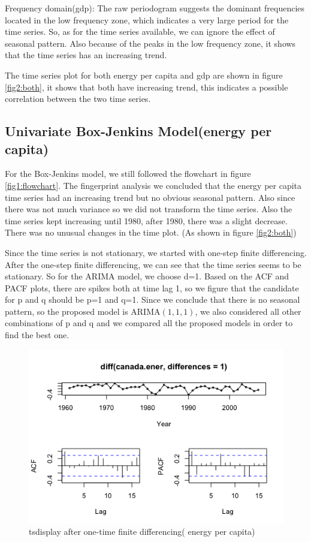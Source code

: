 \documentclass[journal, a4paper]{IEEEtran}
\begin{document}
Frequency domain(gdp): The raw periodogram suggests the dominant frequencies located in the low frequency zone, which indicates a very large period for the time series. So, as for the time series available, we can ignore the effect of seasonal pattern. Also because of the peaks in the low frequency zone, it shows that the time series has an increasing trend.


The time series plot for both energy per capita and gdp are shown in figure \ref{fig2:both}, it shows that both have increasing trend, this indicates a possible correlation between the two time series. 

\subsection{Univariate Box-Jenkins Model(energy per capita)}
For the Box-Jenkins model, we still followed the flowchart in figure \ref{fig1:flowchart}. The fingerprint analysis we concluded that the energy per capita time series had an increasing trend but no obvious seasonal pattern. Also since there was not much variance so we did not transform the time series. Also the time series kept increasing until 1980, after 1980, there was a slight decrease. There was no unusual changes in the time plot. (As shown in figure \ref{fig2:both})

Since the time series is not stationary, we started with one-step finite differencing.
After the one-step finite differencing,  we can see that the time series seems to be stationary. So for the ARIMA model, we choose d=1. 
Based on the ACF and PACF plots, there are spikes both at time lag 1, so we figure that the candidate for p and q should be p=1 and q=1. Since we conclude that there is no seasonal pattern, so the proposed model is ARIMA$(1,1,1)$, we also considered all other combinations of p and q and we compared all the proposed models in order to find the best one.


\begin{figure}[H]
\begin{center}
\includegraphics[scale=0.65]{fig2/diff_energy.png}
\caption{tsdisplay after one-time finite differencing( energy per capita)}
\label{fig2:finite_diff}
\end{center}
\end{figure}
\end{document}
